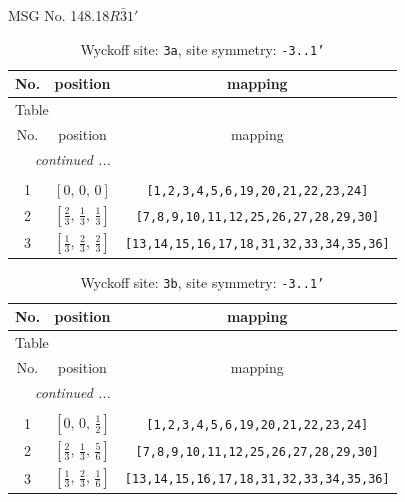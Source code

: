 \documentclass[fleqn,8pt]{jsarticle}
\begin{document}
\setcounter{MaxMatrixCols}{32}

\renewcommand{\tablename}{Table~}
\renewcommand{\figurename}{Figure~}
\begin{center}
\LARGE
MSG No. 148.18\quad$R\bar{3}1'$
\end{center}
\renewcommand{\arraystretch}{1.2}
\begin{longtable}{ccc}
\caption{Wyckoff site: {\tt 3a}, site symmetry: {\tt -3..1'}}
 \\
 \hline \hline
No. & position & mapping \\ \hline \endfirsthead

\multicolumn{2}{l}{\tablename\ \thetable{}} \\
 \hline \hline
No. & position & mapping \\ \hline \endhead

 \hline \hline
\multicolumn{2}{r}{\footnotesize\it continued ...} \\ \endfoot

 \hline \hline
\multicolumn{2}{r}{} \\ \endlastfoot

1 & $\left[ 0,\, 0,\, 0 \right]$ & {\tt [1,2,3,4,5,6,19,20,21,22,23,24]} \\ \hline
2 & $\left[ \frac{2}{3},\, \frac{1}{3},\, \frac{1}{3} \right]$ & {\tt [7,8,9,10,11,12,25,26,27,28,29,30]} \\ \hline
3 & $\left[ \frac{1}{3},\, \frac{2}{3},\, \frac{2}{3} \right]$ & {\tt [13,14,15,16,17,18,31,32,33,34,35,36]} \\
\end{longtable}
\renewcommand{\arraystretch}{1.2}
\begin{longtable}{ccc}
\caption{Wyckoff site: {\tt 3b}, site symmetry: {\tt -3..1'}}
 \\
 \hline \hline
No. & position & mapping \\ \hline \endfirsthead

\multicolumn{2}{l}{\tablename\ \thetable{}} \\
 \hline \hline
No. & position & mapping \\ \hline \endhead

 \hline \hline
\multicolumn{2}{r}{\footnotesize\it continued ...} \\ \endfoot

 \hline \hline
\multicolumn{2}{r}{} \\ \endlastfoot

1 & $\left[ 0,\, 0,\, \frac{1}{2} \right]$ & {\tt [1,2,3,4,5,6,19,20,21,22,23,24]} \\ \hline
2 & $\left[ \frac{2}{3},\, \frac{1}{3},\, \frac{5}{6} \right]$ & {\tt [7,8,9,10,11,12,25,26,27,28,29,30]} \\ \hline
3 & $\left[ \frac{1}{3},\, \frac{2}{3},\, \frac{1}{6} \right]$ & {\tt [13,14,15,16,17,18,31,32,33,34,35,36]} \\
\end{longtable}
\end{document}
